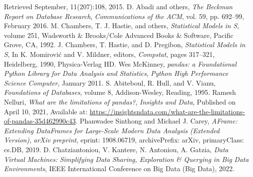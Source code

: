 \documentclass[journal]{IEEEtran} %
\begin{document}
\begin{thebibliography}{00}
    Retrieved September, 11(207):108,
    2015.
    D. Abadi and others,
    \emph{The Beckman Report on Database Research},
    \emph{Communications of the ACM},
    vol. 59,
    pp. 692–99,
    February 2016.
    M. Chambers, T. J. Hastie, and others,
    \emph{Statistical Models in S},
    volume 251,
    Wadsworth \& Brooks/Cole Advanced Books \& Software,
    Pacific Grove, CA,
    1992.
    J. Chambers, T. Hastie, and D. Pregibon,
    \emph{Statistical Models in S},
    In K. Momirović and V. Mildner, editors,
    \emph{Compstat},
    pages 317–321,
    Heidelberg,
    1990,
    Physica-Verlag HD.
    Wes McKinney,
    \emph{pandas: a Foundational Python Library for Data Analysis and Statistics},
    \emph{Python High Performance Science Computer},
    January 2011.
    S. Abiteboul, R. Hull, and V. Vianu,
    \emph{Foundations of Databases},
    volume 8,
    Addison-Wesley,
    Reading,
    1995.
    Ramesh Nelluri,
    \emph{What are the limitations of pandas?},
    \emph{Insights and Data},
    Published on April 10, 2021,
    Available at: \url{https://insightsndata.com/what-are-the-limitations-of-pandas-35d462990c43}.
    Phanwadee Sinthong and Michael J. Carey,
    \emph{AFrame: Extending DataFrames for Large-Scale Modern Data Analysis (Extended Version)},
    \emph{arXiv preprint},
    eprint: 1908.06719,
    archivePrefix: arXiv,
    primaryClass: cs.DB,
    2019.
    D. Chatziantoniou, V. Kantere, N. Antoniou, A. Gatzia,
    \emph{Data Virtual Machines: Simplifying Data Sharing,
    Exploration \& Querying in Big Data Environments},
    IEEE International Conference on Big Data (Big Data),
    2022.
    
\end{thebibliography}
\end{document}
